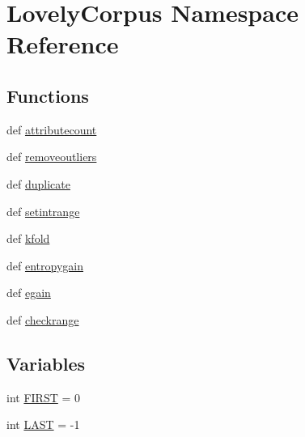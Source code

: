 \hypertarget{namespaceLovelyCorpus}{\section{Lovely\-Corpus Namespace Reference}
\label{namespaceLovelyCorpus}
}
\subsection*{Functions}
\begin{DoxyCompactItemize}
\item 
def \hyperlink{namespaceLovelyCorpus_a50fe9b8303b7280079493145ae1240bb}{attributecount}
\item 
def \hyperlink{namespaceLovelyCorpus_a52842d2b8f172be63ef8fdeb83888e58}{removeoutliers}
\item 
def \hyperlink{namespaceLovelyCorpus_a26ee2374d142e5e6603f0a078fea1974}{duplicate}
\item 
def \hyperlink{namespaceLovelyCorpus_a3599cd818c8da3df834d8b78348e9313}{setintrange}
\item 
def \hyperlink{namespaceLovelyCorpus_a84317382c4e7d9b457294b731ecfc59a}{kfold}
\item 
def \hyperlink{namespaceLovelyCorpus_a550ec4a6c82e820d12e3c623f034324c}{entropygain}
\item 
def \hyperlink{namespaceLovelyCorpus_a506bbed5530bdb141a96231a1997ebf1}{egain}
\item 
def \hyperlink{namespaceLovelyCorpus_a6cc631182ed1413c6f64a00d0ef4f2b9}{checkrange}
\end{DoxyCompactItemize}
\subsection*{Variables}
\begin{DoxyCompactItemize}
\item 
int \hyperlink{namespaceLovelyCorpus_adfa45fc47e2f21cf331cd82de9fc1b8d}{F\-I\-R\-S\-T} = 0
\item 
int \hyperlink{namespaceLovelyCorpus_a43c85bdcbbbe7b7357e099bd6d3dd033}{L\-A\-S\-T} = -\/1
\end{DoxyCompactItemize}


